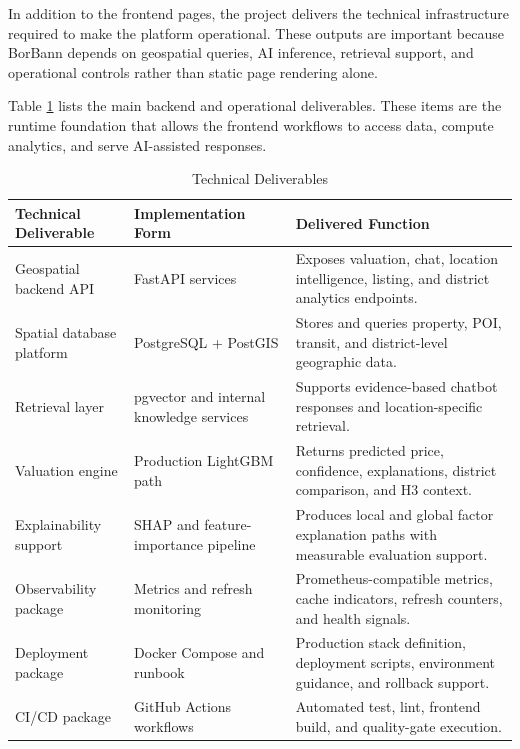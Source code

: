 In addition to the frontend pages, the project delivers the technical infrastructure required to make the platform operational. These outputs are important because BorBann depends on geospatial queries, AI inference, retrieval support, and operational controls rather than static page rendering alone.

Table \ref{tab:chapter7-technical-deliverables} lists the main backend and operational deliverables. These items are the runtime foundation that allows the frontend workflows to access data, compute analytics, and serve AI-assisted responses.

\begin{table}[htbp]
    \centering
    \small
    \renewcommand{\arraystretch}{1.25}
    \begin{tabularx}{\textwidth}{>{\raggedright\arraybackslash}p{}>{\raggedright\arraybackslash}p{}>{\raggedright\arraybackslash}X}
        \toprule
        \rowcolor[gray]{0.9} \textbf{Technical Deliverable} & \textbf{Implementation Form} & \textbf{Delivered Function} \\
        \midrule
        Geospatial backend API & FastAPI services & Exposes valuation, chat, location intelligence, listing, and district analytics endpoints. \\
        Spatial database platform & PostgreSQL + PostGIS & Stores and queries property, POI, transit, and district-level geographic data. \\
        Retrieval layer & pgvector and internal knowledge services & Supports evidence-based chatbot responses and location-specific retrieval. \\
        Valuation engine & Production LightGBM path & Returns predicted price, confidence, explanations, district comparison, and H3 context. \\
        Explainability support & SHAP and feature-importance pipeline & Produces local and global factor explanation paths with measurable evaluation support. \\
        Observability package & Metrics and refresh monitoring & Prometheus-compatible metrics, cache indicators, refresh counters, and health signals. \\
        Deployment package & Docker Compose and runbook & Production stack definition, deployment scripts, environment guidance, and rollback support. \\
        CI/CD package & GitHub Actions workflows & Automated test, lint, frontend build, and quality-gate execution. \\
        \bottomrule
    \end{tabularx}
    \caption{Technical Deliverables}
    \label{tab:chapter7-technical-deliverables}
\end{table}

